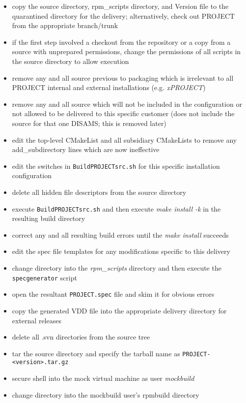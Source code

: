 \documentclass[12pt,letterpaper]{article}
\begin{document}
\begin{itemize}
\item copy the source directory, rpm\_scripts directory, and Version file to the quarantined directory for the delivery; alternatively, check out PROJECT from the appropriate branch/trunk
\item if the first step involved a checkout from the repository or a copy from a source with unprepared permissions, change the permissions of all scripts in the source directory to allow execution
\item remove any and all source previous to packaging which is irrelevant to all PROJECT internal and external installations (e.g. \emph{xPROJECT})
\item remove any and all source which will not be included in the configuration or not allowed to be delivered to this specific customer (does not include the source for that one DISAMS; this is removed later)
\item edit the top-level CMakeList and all subsidiary CMakeLists to remove any add\_subdirectory lines which are now ineffective
\item edit the switches in \verb|BuildPROJECTsrc.sh| for this specific installation configuration
\item delete all hidden file descriptors from the source directory
\item execute \verb|BuildPROJECTsrc.sh| and then execute \emph{make install -k} in the resulting build directory
\item correct any and all resulting build errors until the \emph{make install} succeeds
\item edit the spec file templates for any modifications specific to this delivery
\item change directory into the \emph{rpm\_scripts} directory and then execute the \verb|specgenerator| script
\item open the resultant \verb|PROJECT.spec| file and skim it for obvious errors
\item copy the generated VDD file into the appropriate delivery directory for external releases
\item delete all .svn directories from the source tree
\item tar the source directory and specify the tarball name as \linebreak\verb|PROJECT-<version>.tar.gz|
\item secure shell into the mock virtual machine as user \emph{mockbuild}
\item change directory into the mockbuild user's rpmbuild directory

\end{itemize}
\end{document}
